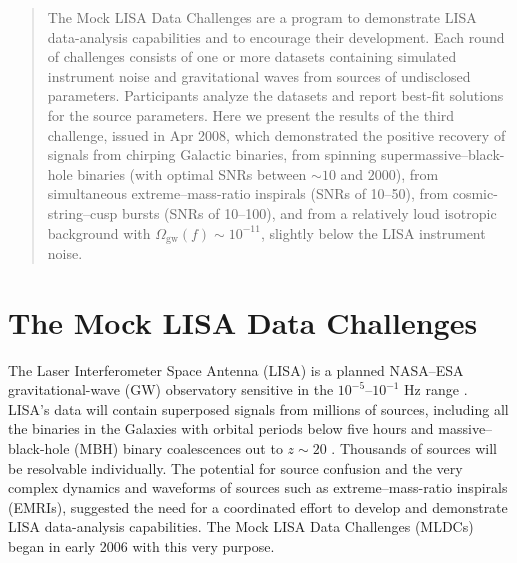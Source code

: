 \documentclass{iopart}
\begin{document}

\begin{abstract}
The Mock LISA Data Challenges are a program to demonstrate LISA data-analysis capabilities and to encourage their development. Each round of challenges consists of one or more datasets containing simulated instrument noise and gravitational waves from sources of undisclosed parameters. Participants analyze the datasets and report best-fit solutions for the source parameters. Here we present the results of the third challenge, issued in Apr 2008, which demonstrated the positive recovery of signals from chirping Galactic binaries, from spinning supermassive--black-hole binaries (with optimal SNRs between $\sim 10$ and $2000$), from simultaneous extreme--mass-ratio inspirals (SNRs of 10--50), from cosmic-string--cusp bursts (SNRs of 10--100), and from a relatively loud isotropic background with $\Omega_\mathrm{gw}(f) \sim 10^{-11}$, slightly below the LISA instrument noise.
\end{abstract}

\vspace{-18pt}


\section{The Mock LISA Data Challenges}

The Laser Interferometer Space Antenna (LISA) is a planned NASA--ESA gravitational-wave (GW) observatory sensitive in the $10^{-5}$--$10^{-1}$ Hz range \cite{lisa}. LISA's data will contain superposed signals from millions of sources, including all the binaries in the Galaxies with orbital periods below five hours and massive--black-hole (MBH) binary coalescences out to $z \sim 20$ \cite{baker2007}. Thousands of sources will be resolvable individually. The potential for source confusion and the very complex dynamics and waveforms of sources such as extreme--mass-ratio inspirals (EMRIs), suggested the need for a coordinated effort to develop and demonstrate LISA data-analysis capabilities. The Mock LISA Data Challenges (MLDCs) began in early 2006 with this very purpose.
\end{document}
